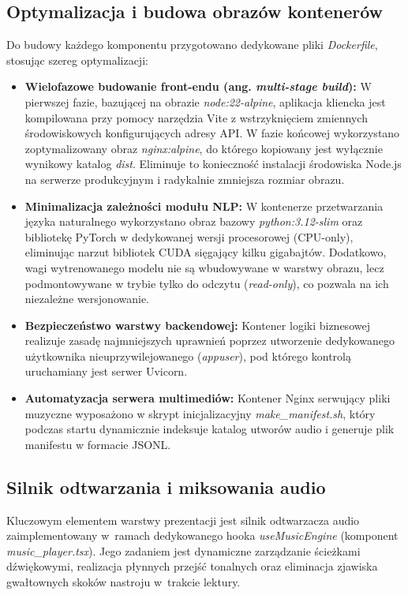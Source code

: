 \subsection{Optymalizacja i budowa obrazów kontenerów}
Do budowy każdego komponentu przygotowano dedykowane pliki
\textit{Dockerfile}, stosując szereg optymalizacji:
\begin{itemize}
    \item \textbf{Wielofazowe budowanie front-endu (ang.
    \textit{multi-stage build}):} W pierwszej fazie, bazującej na obrazie
    \textit{node:22-alpine}, aplikacja kliencka jest kompilowana przy
    pomocy narzędzia Vite z wstrzyknięciem zmiennych środowiskowych
    konfigurujących adresy API. W fazie końcowej wykorzystano
    zoptymalizowany obraz \textit{nginx:alpine}, do którego kopiowany
    jest wyłącznie wynikowy katalog \textit{dist}. Eliminuje to
    konieczność instalacji środowiska Node.js na serwerze produkcyjnym i
    radykalnie zmniejsza rozmiar obrazu.
    \item \textbf{Minimalizacja zależności modułu NLP:} W kontenerze 
    przetwarzania języka naturalnego wykorzystano obraz bazowy 
    \textit{python:3.12-slim} oraz bibliotekę PyTorch w dedykowanej
    wersji procesorowej (CPU-only), eliminując narzut bibliotek CUDA
    sięgający kilku gigabajtów. Dodatkowo, wagi wytrenowanego modelu nie
    są wbudowywane w warstwy obrazu, lecz podmontowywane w trybie tylko
    do odczytu (\textit{read-only}), co pozwala na ich niezależne
    wersjonowanie.
    \item \textbf{Bezpieczeństwo warstwy backendowej:} Kontener logiki 
    biznesowej realizuje zasadę najmniejszych uprawnień poprzez
    utworzenie dedykowanego użytkownika nieuprzywilejowanego
    (\textit{appuser}), pod którego kontrolą uruchamiany jest serwer
    Uvicorn.
    \item \textbf{Automatyzacja serwera multimediów:} Kontener Nginx
    serwujący pliki muzyczne wyposażono w skrypt inicjalizacyjny
    \textit{make\_manifest.sh}, który podczas startu dynamicznie
    indeksuje katalog utworów audio i generuje plik manifestu w formacie
    JSONL.
\end{itemize}

\subsection{Silnik odtwarzania i miksowania audio}
Kluczowym elementem warstwy prezentacji jest silnik odtwarzacza audio zaimplementowany w~ramach dedykowanego hooka \textit{useMusicEngine} (komponent \textit{music\_player.tsx}). Jego
zadaniem jest dynamiczne zarządzanie ścieżkami dźwiękowymi, realizacja płynnych przejść tonalnych oraz eliminacja zjawiska gwałtownych skoków nastroju w~trakcie lektury.

